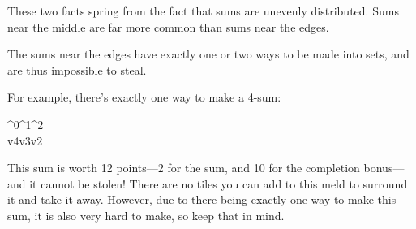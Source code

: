 These two facts spring from the fact that sums are unevenly distributed. 
Sums near the middle are far more common than sums near the edges.

The sums near the edges have exactly one or two ways to be made into sets, and are thus impossible to steal.

For example, there's exactly one way to make a 4-sum:
\begin{center}
	{ \domino%
		^0^1^2\\
		v4v3v2\\%
	}
\end{center}

This sum is worth 12 points---2 for the sum, and 10 for the completion bonus---and it cannot be stolen! There are no tiles you can add to this meld to surround it and take it away.
However, due to there being exactly one way to make this sum, it is also very hard to make, so keep that in mind.